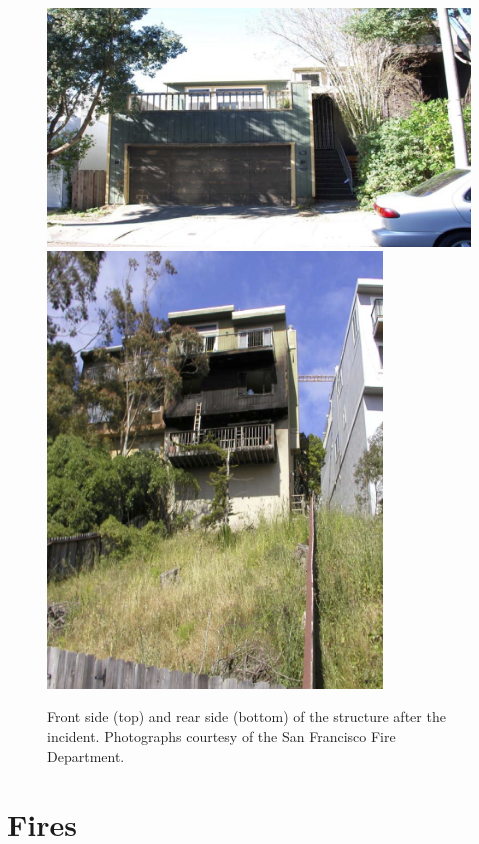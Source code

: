\documentclass[12pt,oneside]{book}
\begin{document}
\begin{figure}[!ht]
\includegraphics[width=5.50in]{../Figures/Post_Exterior_Front} \\
\vspace{0.1in}
\includegraphics[width=3.50in]{../Figures/Post_Exterior_Rear}
\caption[Front and rear sides of the structure after the incident.]
{Front side (top) and rear side (bottom) of the structure after the incident. Photographs courtesy of the San Francisco Fire Department.}
\label{fig:post_exterior}
\end{figure}

\section{Fires}
\label{sec:fires}
\end{document}
